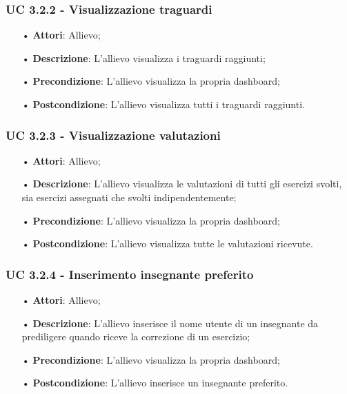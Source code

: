 \subsubsection{UC 3.2.2 - Visualizzazione traguardi}
\begin{itemize}
\item[•]\textbf{Attori}: Allievo;
\item[•]\textbf{Descrizione}: L'allievo visualizza i traguardi raggiunti;
\item[•]\textbf{Precondizione}: L'allievo visualizza la propria dashboard;
\item[•]\textbf{Postcondizione}: L'allievo visualizza tutti i traguardi raggiunti.
\end{itemize}

\subsubsection{UC 3.2.3 - Visualizzazione valutazioni}
\begin{itemize}
\item[•]\textbf{Attori}: Allievo;
\item[•]\textbf{Descrizione}: L'allievo visualizza le valutazioni di tutti gli esercizi svolti, sia esercizi assegnati che svolti indipendentemente;
\item[•]\textbf{Precondizione}: L'allievo visualizza la propria dashboard;
\item[•]\textbf{Postcondizione}: L'allievo visualizza tutte le valutazioni ricevute.
\end{itemize}

\subsubsection{UC 3.2.4 - Inserimento insegnante preferito}
\begin{itemize}
\item[•]\textbf{Attori}: Allievo;
\item[•]\textbf{Descrizione}: L'allievo inserisce il nome utente di un insegnante da prediligere quando riceve la correzione di un esercizio;
\item[•]\textbf{Precondizione}: L'allievo visualizza la propria dashboard;
\item[•]\textbf{Postcondizione}: L'allievo inserisce un insegnante preferito.
\end{itemize}

